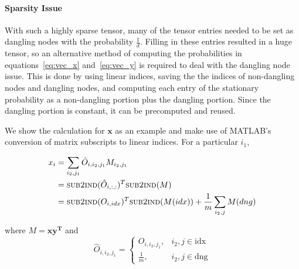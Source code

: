 \paragraph{Sparsity Issue}
With such a highly sparse tensor, many of the tensor entries needed to be set as dangling nodes with the probability $\frac{1}{d}$. Filling in these entries resulted in a huge tensor, so an alternative method of computing the probabilities in equations~\ref{eq:vec_x} and~\ref{eq:vec_y} is required to deal with the dangling node issue. This is done by using linear indices, saving the the indices of non-dangling nodes and dangling nodes, and computing each entry of the stationary probability as a non-dangling portion plus the dangling portion. Since the dangling portion is constant, it can be precomputed and reused. 

We show the calculation for $\mathbf{x}$ as an example and make use of MATLAB's conversion of matrix subscripts to linear indices. For a particular $i_1$,

\begin{align*}
    x_i &= \sum_{i_2,j_1} \hat{O}_{i,i_2,j_1} M_{i_2,j_1} \\
                &= \textsc{sub2ind}(\hat{O}_{i,:,:})^T \textsc{sub2ind}(M) \\
                &= \textsc{sub2ind}(O_{i,idx})^T \textsc{sub2ind}(M(idx)) + \frac{1}{m} \sum_{i_2,j} M(dng) 
\end{align*}

where $M=\mathbf{xy^T}$ and $$
\hat{O}_{i,i_2,j_1} =
\begin{cases}
O_{i,i_2,j_1}, & i_2,j \in \text{idx} \\
\frac{1}{m}, & i_2,j \in \text{dng}
\end{cases} $$
